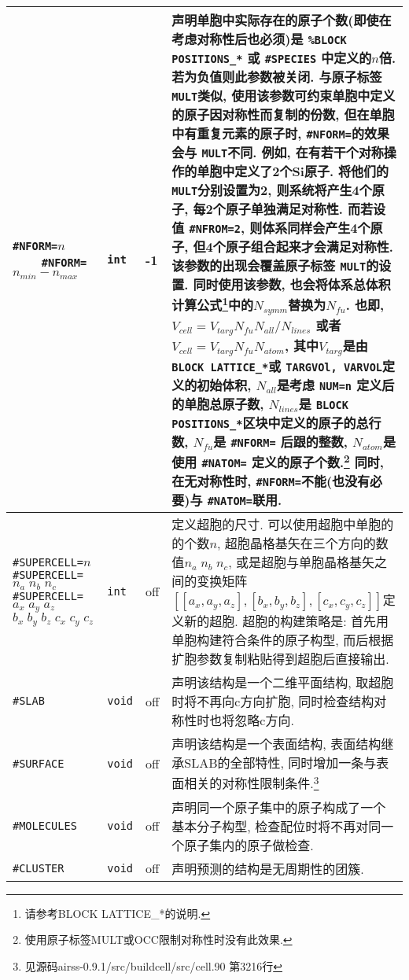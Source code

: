 \documentclass[a4paper, 10pt]{article}
\begin{document}
\begin{center}
\begin{longtable}{m{11em}|m{4em}<{\centering}|m{3em}<{\centering}|m{15em}}
 \verb|#NFORM=|\(n\)\ \ \ \ \verb|#NFORM=|\(n_{min}-n_{max}\) & \verb|int| & -1 & 声明单胞中实际存在的原子个数(即使在考虑对称性后也必须)是 \verb|%BLOCK POSITIONS_*| 或 \verb|#SPECIES| 中定义的\(n\)倍. 若为负值则此参数被关闭. 与原子标签 \verb|MULT|类似, 使用该参数可约束单胞中定义的原子因对称性而复制的份数, 但在单胞中有重复元素的原子时, \verb|#NFORM=|的效果会与 \verb|MULT|不同. 例如, 在有若干个对称操作的单胞中定义了2个Si原子. 将他们的 \verb|MULT|分别设置为2, 则系统将产生4个原子, 每2个原子单独满足对称性. 而若设值 \verb|#NFROM=2|, 则体系同样会产生4个原子, 但4个原子组合起来才会满足对称性. 该参数的出现会覆盖原子标签 \verb|MULT|的设置. 同时使用该参数, 也会将体系总体积计算公式\footnote{请参考BLOCK LATTICE\_*的说明.}中的\(N_{symm}\)替换为\(N_{fu}\). 也即, \(V_{cell} = V_{targ} N_{fu} N_{all} / N_{lines}\) 或者 \(V_{cell} = V_{targ} N_{fu} N_{atom} \), 其中\(V_{targ}\)是由 \verb|BLOCK LATTICE_*|或 \verb|TARGVOl, VARVOL|定义的初始体积, \(N_{all}\)是考虑 \verb|NUM=n| 定义后的单胞总原子数, \(N_{lines}\)是 \verb|BLOCK POSITIONS_*|区块中定义的原子的总行数, \(N_{fu}\)是 \verb|#NFORM=| 后跟的整数, \(N_{atom}\)是使用 \verb|#NATOM=| 定义的原子个数.\footnote{使用原子标签MULT或OCC限制对称性时没有此效果.} 同时, 在无对称性时, \verb|#NFORM=|不能(也没有必要)与 \verb|#NATOM=|联用.\\
\midrule
 \verb|#SUPERCELL=|\(n\) \verb|#SUPERCELL=|\(n_a\;n_b\;n_c\;\;\;\;\;\;\) \hspace{2em} \verb|#SUPERCELL=|\(a_x\; a_y\;a_z\;\)\hspace{2em} \(b_x\;b_y\;b_z\;c_x\;c_y\;c_z\) & \verb|int| & off & 定义超胞的尺寸. 可以使用超胞中单胞的的个数\(n\), 超胞晶格基矢在三个方向的数值\(n_a\;n_b\;n_c\), 或是超胞与单胞晶格基矢之间的变换矩阵\([[a_x,a_y,a_z],[b_x,b_y,b_z],[c_x,c_y,c_z]]\)定义新的超胞. 超胞的构建策略是: 首先用单胞构建符合条件的原子构型, 而后根据扩胞参数复制粘贴得到超胞后直接输出.\\
\midrule
 \verb|#SLAB| & \verb|void| & off & 声明该结构是一个二维平面结构, 取超胞时将不再向c方向扩胞, 同时检查结构对称性时也将忽略c方向.\\
\midrule
 \verb|#SURFACE| & \verb|void| & off & 声明该结构是一个表面结构, 表面结构继承SLAB的全部特性, 同时增加一条与表面相关的对称性限制条件.\footnote{见源码airss-0.9.1/src/buildcell/src/cell.90 第3216行}\\
\midrule
 \verb|#MOLECULES|& \verb|void| & off & 声明同一个原子集中的原子构成了一个基本分子构型, 检查配位时将不再对同一个原子集内的原子做检查.\\
\midrule
 \verb|#CLUSTER| & \verb|void| & off & 声明预测的结构是无周期性的团簇.\\

\end{longtable}
\end{center}
\end{document}
